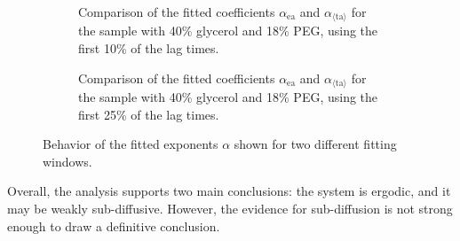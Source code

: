 \begin{figure}[!htbp]
    \centering
    \begin{subfigure}[t]{0.48\textwidth}
        \centering
        
        \caption{Comparison of the fitted coefficients $\alpha_{\mathrm{ea}}$ and $\alpha_{\langle \mathrm{ta} \rangle}$ for the sample with 40\% glycerol and 18\% PEG, using the first 10\% of the lag times.}
        \label{fig:alpha_paired_glic200_f010}
    \end{subfigure}
    \hfill
    \begin{subfigure}[t]{0.48\textwidth}
        \centering
        
        \caption{Comparison of the fitted coefficients $\alpha_{\mathrm{ea}}$ and $\alpha_{\langle \mathrm{ta} \rangle}$ for the sample with 40\% glycerol and 18\% PEG, using the first 25\% of the lag times.}
        \label{fig:alpha_paired_glic200_f025}
    \end{subfigure}

    \caption{Behavior of the fitted exponents $\alpha$ shown for two different fitting windows.}
    \label{fig:alpha_paired_glic200}
\end{figure}
\FloatBarrier
Overall, the analysis supports two main conclusions: the system is ergodic, and it may be weakly sub-diffusive. However, the evidence for sub-diffusion is not strong enough to draw a definitive conclusion.

